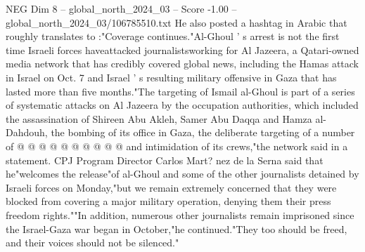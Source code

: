 \begin{textsample}{NEG Dim 8 – global\_north\_2024\_03 – Score -1.00 – global\_north\_2024\_03/106785510.txt}
He also posted a hashtag in Arabic that roughly translates to :"Coverage continues."Al-Ghoul ' s arrest is not the first time Israeli forces haveattacked journalistsworking for Al Jazeera, a Qatari-owned media network that has credibly covered global news, including the Hamas attack in Israel on Oct. 7 and Israel ' s resulting military offensive in Gaza that has lasted more than five months."The targeting of Ismail al-Ghoul is part of a series of systematic attacks on Al Jazeera by the occupation authorities, which included the assassination of Shireen Abu Akleh, Samer Abu Daqqa and Hamza al-Dahdouh, the bombing of its office in Gaza, the deliberate targeting of a number of @ @ @ @ @ @ @ @ @ @ and intimidation of its crews,"the network said in a statement.
CPJ Program Director Carlos Mart? nez de la Serna said that he"welcomes the release"of al-Ghoul and some of the other journalists detained by Israeli forces on Monday,"but we remain extremely concerned that they were blocked from covering a major military operation, denying them their press freedom rights.""In addition, numerous other journalists remain imprisoned since the Israel-Gaza war began in October,"he continued."They too should be freed, and their voices should not be silenced."

\end{textsample}
